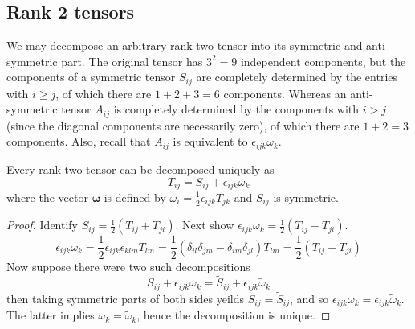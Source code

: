 \documentclass[a4paper]{article}
\begin{document}
\subsection{Rank 2 tensors}
We may decompose an arbitrary rank two tensor into its symmetric and anti-symmetric part. The original tensor has $3^2=9$ independent components, but the components of a symmetric tensor $S_{ij}$ are completely determined by the entries with $i\geq j$, of which there are $1+2+3=6$ components. Whereas an anti-symmetric tensor $A_{ij}$ is completely determined by the components with $i>j$ (since the diagonal components are necessarily zero), of which there are $1+2=3$ components. Also, recall that $A_{ij}$ is equivalent to $\epsilon_{ijk}\omega_k$.
\begin{prop}
Every rank two tensor can be decomposed uniquely as
$$T_{ij}=S_{ij}+\epsilon_{ijk}\omega_k$$
where the vector $\boldsymbol{\omega}$ is defined by $\omega_i=\frac{1}{2}\epsilon_{ijk}T_{jk}$ and $S_{ij}$ is symmetric.
\end{prop}
\begin{proof}
Identify $S_{ij}=\frac{1}{2}(T_{ij}+T_{ji})$. Next show $\epsilon_{ijk}\omega_k=\frac{1}{2}(T_{ij}-T_{ji})$.
$$\epsilon_{ijk}\omega_k=\frac{1}{2}\epsilon_{ijk}\epsilon_{klm}T_{lm}=\frac{1}{2}(\delta_{il}\delta_{jm}-\delta_{im}\delta_{jl})T_{lm}=\frac{1}{2}(T_{ij}-T_{ji})$$
Now suppose there were two such decompositions
$$S_{ij}+\epsilon_{ijk}\omega_k=\tilde{S}_{ij}+\epsilon_{ijk}\tilde{\omega}_k$$
then taking symmetric parts of both sides yeilds $S_{ij}=\tilde{S}_{ij}$, and so $\epsilon_{ijk}\omega_k=\epsilon_{ijk}\tilde{\omega}_k$. The latter implies $\omega_k=\tilde{\omega}_k$, hence the decomposition is unique.
\end{proof}
\end{document}
